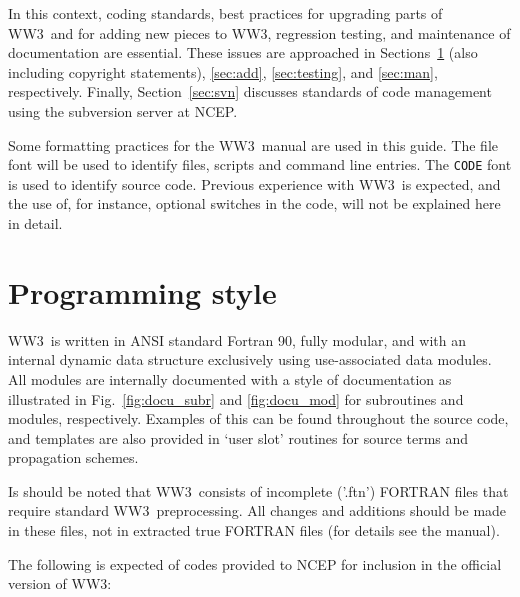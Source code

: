\documentclass[12pt]{article}
\newcommand{\ws}{WW3}
\newcommand{\file}{\sf}
\newcommand{\code}{\tt}
\newcommand{\pb}{\strut \vfill \pagebreak}
\newcommand{\newsec}{\setcounter{equation}{0}
                      \setcounter{myfigno}{0}
                      \setcounter{mytabno}{0}}
\newcounter{myfigno}[section]
\newcounter{mytabno}[section]
\begin{document}
In this context, coding standards, best practices for upgrading parts of \ws\
and for adding new pieces to \ws, regression testing, and maintenance of
documentation are essential. These issues are approached in
Sections~\ref{sec:style} (also including copyright statements), \ref{sec:add},
\ref{sec:testing}, and \ref{sec:man}, respectively.  Finally,
Section~\ref{sec:svn} discusses standards of code management using the
subversion server at NCEP.

Some formatting practices for the \ws\ manual are used in this guide. The
{\file file} font will be used to identify files, scripts and command line
entries. The {\code CODE} font is used to identify source code. Previous
experience with \ws\ is expected, and the use of, for instance, optional
switches in the code, will not be explained here in detail.


\pb
\section{Programming style} \label{sec:style}
\newsec

\ws\ is written in ANSI standard Fortran 90, fully modular, and with an
internal dynamic data structure exclusively using use-associated data modules.
All modules are internally documented with a style of documentation as
illustrated in Fig.~\ref{fig:docu_subr} and \ref{fig:docu_mod} for subroutines
and modules, respectively. Examples of this can be found throughout the source
code, and templates are also provided in `user slot' routines for source terms
and propagation schemes. 

Is should be noted that \ws\ consists of incomplete ('{\file .ftn}') FORTRAN
files that require standard \ws\ preprocessing. All changes and additions
should be made in these files, not in extracted true FORTRAN files (for
details see the manual).

The following is expected of codes provided to NCEP for inclusion in the
official version of \ws :
\end{document}
